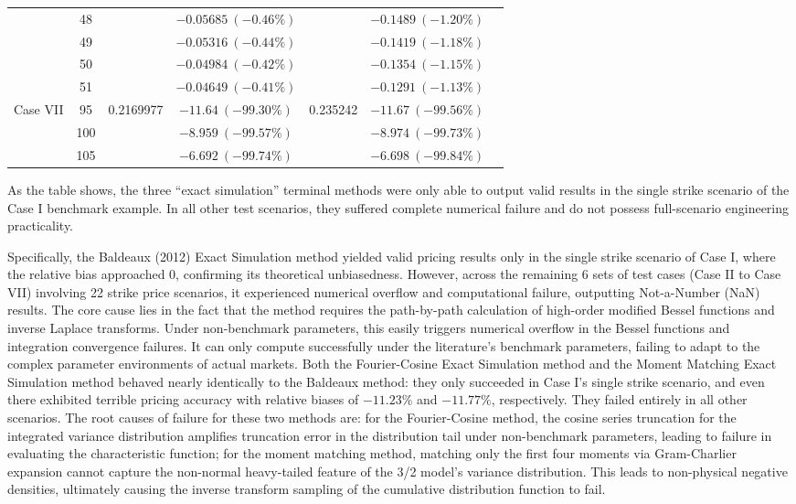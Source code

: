 \begin{table}[htbp]
{\begin{tabular}{lclcccc}
    & 48 &  & $-0.05685\ (-0.46\%)$ &  & $-0.1489\ (-1.20\%)$ \\
    & 49 &  & $-0.05316\ (-0.44\%)$ &  & $-0.1419\ (-1.18\%)$ \\
    & 50 &  & $-0.04984\ (-0.42\%)$ &  & $-0.1354\ (-1.15\%)$ \\
    & 51 &  & $-0.04649\ (-0.41\%)$ &  & $-0.1291\ (-1.13\%)$ \\
    \midrule
    \multirow{3}{*}{Case VII} & 95 & 0.2169977 & $-11.64\ (-99.30\%)$ & 0.235242 & $-11.67\ (-99.56\%)$ \\
    & 100 &  & $-8.959\ (-99.57\%)$ &  & $-8.974\ (-99.73\%)$ \\
    & 105 &  & $-6.692\ (-99.74\%)$ &  & $-6.698\ (-99.84\%)$ \\
    \bottomrule
  \end{tabular}%
  }
\end{table}

As the table shows, the three ``exact simulation'' terminal methods were only able to output valid results in the single strike scenario of the Case I benchmark example. In all other test scenarios, they suffered complete numerical failure and do not possess full-scenario engineering practicality.

Specifically, the Baldeaux (2012) Exact Simulation method yielded valid pricing results only in the single strike scenario of Case I, where the relative bias approached $0$, confirming its theoretical unbiasedness. However, across the remaining 6 sets of test cases (Case II to Case VII) involving 22 strike price scenarios, it experienced numerical overflow and computational failure, outputting Not-a-Number (NaN) results. The core cause lies in the fact that the method requires the path-by-path calculation of high-order modified Bessel functions and inverse Laplace transforms. Under non-benchmark parameters, this easily triggers numerical overflow in the Bessel functions and integration convergence failures. It can only compute successfully under the literature's benchmark parameters, failing to adapt to the complex parameter environments of actual markets. Both the Fourier-Cosine Exact Simulation method and the Moment Matching Exact Simulation method behaved nearly identically to the Baldeaux method: they only succeeded in Case I's single strike scenario, and even there exhibited terrible pricing accuracy with relative biases of $-11.23\%$ and $-11.77\%$, respectively. They failed entirely in all other scenarios. The root causes of failure for these two methods are: for the Fourier-Cosine method, the cosine series truncation for the integrated variance distribution amplifies truncation error in the distribution tail under non-benchmark parameters, leading to failure in evaluating the characteristic function; for the moment matching method, matching only the first four moments via Gram-Charlier expansion cannot capture the non-normal heavy-tailed feature of the 3/2 model's variance distribution. This leads to non-physical negative densities, ultimately causing the inverse transform sampling of the cumulative distribution function to fail.

